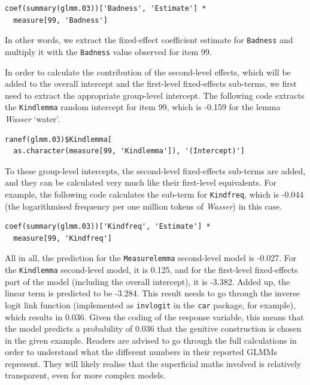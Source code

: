 \vspace{0.5\baselineskip}

\begin{lstlisting}
coef(summary(glmm.03))['Badness', 'Estimate'] *
  measure[99, 'Badness']
\end{lstlisting}

In other words, we extract the fixed-effect coefficient estimate for \texttt{Badness} and multiply it with the \texttt{Badness} value observed for item 99.

In order to calculate the contribution of the second-level effects, which will be added to the overall intercept and the first-level fixed-effects sub-terms, we first need to extract the appropriate group-level intercept.
The following code extracts the \texttt{Kindlemma} random intercept for item 99, which is -0.159 for the lemma \textit{Wasser} `water'.

\vspace{0.5\baselineskip}

\begin{lstlisting}
ranef(glmm.03)$Kindlemma[
  as.character(measure[99, 'Kindlemma']), '(Intercept)']
\end{lstlisting}

To these group-level intercepts, the second-level fixed-effects sub-terms are added, and they can be calculated very much like their first-level equivalents.
For example, the following code calculates the sub-term for \texttt{Kindfreq}, which is -0.044 (the logarithmised frequency per one million tokens of \textit{Wasser}) in this case.

\vspace{0.5\baselineskip}

\begin{lstlisting}
coef(summary(glmm.03))['Kindfreq', 'Estimate'] *
  measure[99, 'Kindfreq']
\end{lstlisting}

All in all, the prediction for the \texttt{Measurelemma} second-level model is -0.027.
For the \texttt{Kindlemma} second-level model, it is 0.125, and for the first-level fixed-effects part of the model (including the overall intercept), it is -3.382.
Added up, the linear term is predicted to be -3.284.
This result needs to go through the inverse logit link function (implemented as \texttt{invlogit} in the \texttt{car} package, for example), which results in 0.036.
Given the coding of the response variable, this means that the model predicts a probability of 0.036 that the genitive construction is chosen in the given example.
Readers are advised to go through the full calculations in order to understand what the different numbers in their reported GLMMs represent.
They will likely realise that the superficial maths involved is relatively transparent, even for more complex models.
